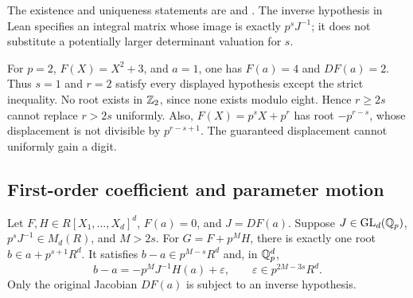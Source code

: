 The existence and uniqueness statements are
 and
.
The inverse hypothesis in Lean specifies an integral matrix whose image
is exactly $p^sJ^{-1}$; it does not substitute a potentially larger
determinant valuation for $s$.

\begin{example}
\label{ex:weighted-boundary}
For $p=2$, $F(X)=X^2+3$, and $a=1$, one has $F(a)=4$ and $DF(a)=2$.
Thus $s=1$ and $r=2$ satisfy every displayed hypothesis except the strict
inequality. No root exists in $\mathbb Z_2$, since none exists modulo eight.
Hence $r\ge2s$ cannot replace $r>2s$ uniformly. Also,
$F(X)=p^sX+p^r$ has root $-p^{r-s}$, whose displacement is not divisible
by $p^{r-s+1}$. The guaranteed displacement cannot uniformly gain a digit.
\end{example}

\subsection{First-order coefficient and parameter motion}

\begin{theorem}\label{thm:coefficient-motion}
Let $F,H\in R[X_1,\ldots,X_d]^d$, $F(a)=0$, and $J=DF(a)$. Suppose
$J\in\operatorname{GL}_d(\mathbb Q_p)$, $p^sJ^{-1}\in M_d(R)$, and $M>2s$.
For $G=F+p^MH$, there is exactly one root $b\in a+p^{s+1}R^d$.
It satisfies $b-a\in p^{M-s}R^d$ and, in $\mathbb Q_p^d$,
\begin{equation}\label{eq:coefficient-first-order}
 b-a=-p^MJ^{-1}H(a)+\varepsilon,
 \qquad\varepsilon\in p^{2M-3s}R^d.
\end{equation}
Only the original Jacobian $DF(a)$ is subject to an inverse hypothesis.
\end{theorem}

